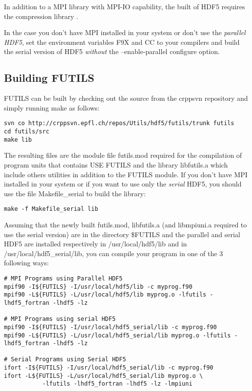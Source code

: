 \documentclass[a4paper]{article}
\begin{document}
In addition to a MPI library with MPI-IO capability, the built of HDF5
requires the compression library .

In the case you don't have MPI installed in your system or don't use the
{\itshape parallel HDF5\/}, set the environment variables
F9X and CC to your compilers and build the serial version of
HDF5 {\itshape without\/} the {\ttfamily --enable-parallel} configure option.




\subsection{Building FUTILS}

FUTILS can be built by checking out the source from the {\ttfamily crppsvn}
repository and simply running {\ttfamily make} as follows:
\begin{tscreen}
\begin{verbatim}
svn co http://crppsvn.epfl.ch/repos/Utils/hdf5/futils/trunk futils
cd futils/src
make lib
\end{verbatim}
\end{tscreen}

The resulting files are the module file {\ttfamily futils.mod} required for the
compilation of program units that contains {\ttfamily USE FUTILS} and the library
{\ttfamily libfutils.a} which include others utilities in addition to the FUTILS
module.
If you don't have {\ttfamily MPI} installed in your system or if you want to use only
the {\itshape serial\/} HDF5, you should use the file {\ttfamily Makefile\_serial}
to build the library:
\begin{tscreen}
\begin{verbatim}
make -f Makefile_serial lib
\end{verbatim}
\end{tscreen}




Assuming that the newly built {\ttfamily futils.mod, libfutils.a}
(and {\ttfamily libmpiuni.a} required to use the serial version)
are in the directory {\ttfamily \$FUTILS} and the parallel and serial HDF5 are
installed respectively in {\ttfamily /usr/local/hdf5/lib} and in
{\ttfamily /usr/local/hdf5\_serial/lib},
you can compile your program in one of the 3 following ways:
\begin{tscreen}
\begin{verbatim}
# MPI Programs using Parallel HDF5
mpif90 -I${FUTILS} -I/usr/local/hdf5/lib -c myprog.f90
mpif90 -L${FUTILS} -L/usr/local/hdf5/lib myprog.o -lfutils -lhdf5_fortran -lhdf5 -lz

# MPI Programs using serial HDF5
mpif90 -I${FUTILS} -I/usr/local/hdf5_serial/lib -c myprog.f90
mpif90 -L${FUTILS} -L/usr/local/hdf5_serial/lib myprog.o -lfutils -lhdf5_fortran -lhdf5 -lz

# Serial Programs using Serial HDF5
ifort -I${FUTILS} -I/usr/local/hdf5_serial/lib -c myprog.f90
ifort -L${FUTILS} -L/usr/local/hdf5_serial/lib myprog.o \
           -lfutils -lhdf5_fortran -lhdf5 -lz -lmpiuni
\end{verbatim}
\end{tscreen}
\end{document}
